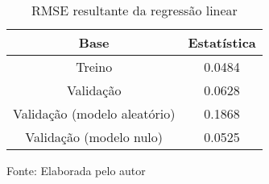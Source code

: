
\begin{table}[h]
\centering
\caption{RMSE resultante da regressão linear}
\label{tab:cap3_rmse_reg_lin}
\begin{tabular}{cc}
Base & Estatística \\
\hline
Treino & 0.0484 \\
Validação & 0.0628 \\
Validação (modelo aleatório) & 0.1868 \\
Validação (modelo nulo) & 0.0525 \\
\hline
\end{tabular}

Fonte: Elaborada pelo autor
\end{table}
